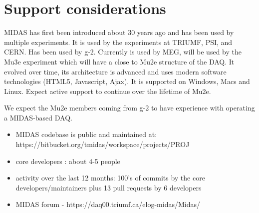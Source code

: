 \section{Support considerations}

MIDAS has first been introduced about 30 years ago and has been used
by multiple experiments. It is used by the experiments at TRIUMF, PSI,
and CERN. Has been used by g-2. Currently is used by MEG, will be used by the Mu3e experiment which will have
a close to Mu2e structure of the DAQ.
It evolved over time, its architecture is advanced and uses modern software
technologies (HTML5, Javascript, Ajax).
It is supported on Windows, Macs and Linux.
Expect active support to continue over the lifetime of Mu2e.

We expect the Mu2e members coming from g-2 to have experience with operating
a MIDAS-based DAQ.

\begin{itemize}
\item 
  MIDAS codebase is public and maintained at: https://bitbucket.org/tmidas/workspace/projects/PROJ
\item
  core developers : about 4-5 people
\item
  activity over the last 12 months: 100's of commits by the core developers/maintainers plus
  13 pull requests by 6 developers
\item 
  MIDAS forum - https://daq00.triumf.ca/elog-midas/Midas/
\end{itemize}




